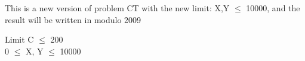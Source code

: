 This is a new version of problem CT with the new limit: X,Y $\le$ 10000, and the result will be written in modulo 2009  

Limit
C  $\le$  200   
\\   0  $\le$  X, Y  $\le$  10000